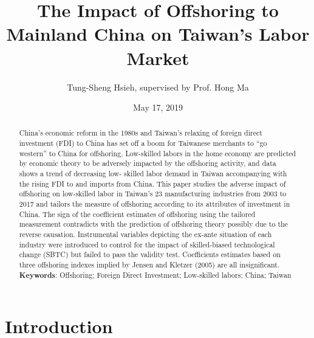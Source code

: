 \documentclass{article}
\title{The Impact of Offshoring to Mainland China on Taiwan’s Labor Market}
\author{Tung-Sheng Hsieh, supervised by Prof. Hong Ma}
\affil{SEM, Tsinghua University}
\date{May 17, 2019}
\begin{document}
\maketitle

\begin{abstract}
China’s economic reform in the 1980s and Taiwan’s relaxing of foreign direct investment (FDI) to China has set off a boom for Taiwanese merchants to “go western” to China for offshoring. Low-skilled labors in the home economy are predicted by economic theory to be adversely impacted by the offshoring activity, and data shows a trend of decreasing low- skilled labor demand in Taiwan accompanying with the rising FDI to and imports from China. This paper studies the adverse impact of offshoring on low-skilled labor in Taiwan’s 23 manufacturing industries from 2003 to 2017 and tailors the measure of offshoring according to its attributes of investment in China. The sign of the coefficient estimates of offshoring using the tailored measurement contradicts with the prediction of offshoring theory possibly due to the reverse causation. Instrumental variables depicting the ex-ante situation of each industry were introduced to control for the impact of skilled-biased technological change (SBTC) but failed to pass the validity test. Coefficients estimates based on three offshoring indexes implied by Jensen and Kletzer (2005) are all insignificant.\\

\textbf{Keywords}: Offshoring; Foreign Direct Investment; Low-skilled labors; China; Taiwan

\end{abstract}

\section{Introduction}
\end{document}
